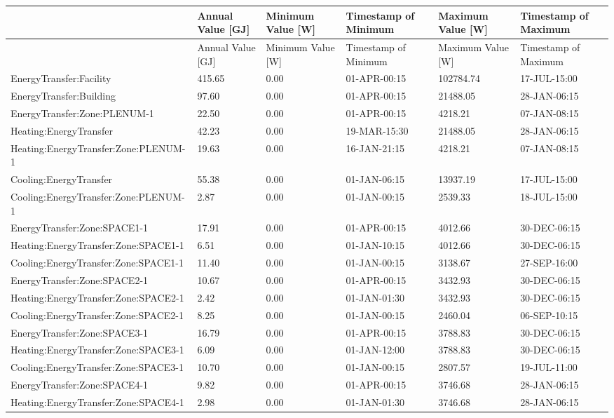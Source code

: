 {\scriptsize
\begin{longtable}[c]{>{\raggedright}p{1.0in}>{\raggedright}p{1.0in}>{\raggedright}p{1.0in}>{\raggedright}p{1.0in}>{\raggedright}p{1.0in}>{\raggedright}p{1.0in}}
\toprule 
 & Annual Value [GJ] & Minimum Value [W] & Timestamp of Minimum & Maximum Value [W] & Timestamp of Maximum \tabularnewline
\midrule
\endfirsthead

\toprule 
 & Annual Value [GJ] & Minimum Value [W] & Timestamp of Minimum & Maximum Value [W] & Timestamp of Maximum \tabularnewline
\midrule
\endhead

EnergyTransfer\-:Facility & 415.65 & 0.00 & 01-APR-00\-:15 & 102784.74 & 17-JUL-15\-:00 \tabularnewline
EnergyTransfer\-:Building & 97.60 & 0.00 & 01-APR-00\-:15 & 21488.05 & 28-JAN-06\-:15 \tabularnewline
EnergyTransfer\-:Zone\-:PLENUM-1 & 22.50 & 0.00 & 01-APR-00\-:15 & 4218.21 & 07-JAN-08\-:15 \tabularnewline
Heating\-:EnergyTransfer & 42.23 & 0.00 & 19-MAR-15\-:30 & 21488.05 & 28-JAN-06\-:15 \tabularnewline
Heating\-:EnergyTransfer\-:Zone\-:PLENUM-1 & 19.63 & 0.00 & 16-JAN-21\-:15 & 4218.21 & 07-JAN-08\-:15 \tabularnewline
Cooling\-:EnergyTransfer & 55.38 & 0.00 & 01-JAN-06\-:15 & 13937.19 & 17-JUL-15\-:00 \tabularnewline
Cooling\-:EnergyTransfer\-:Zone\-:PLENUM-1 & 2.87 & 0.00 & 01-JAN-00\-:15 & 2539.33 & 18-JUL-15\-:00 \tabularnewline
EnergyTransfer\-:Zone\-:SPACE1-1 & 17.91 & 0.00 & 01-APR-00\-:15 & 4012.66 & 30-DEC-06\-:15 \tabularnewline
Heating\-:EnergyTransfer\-:Zone\-:SPACE1-1 & 6.51 & 0.00 & 01-JAN-10\-:15 & 4012.66 & 30-DEC-06\-:15 \tabularnewline
Cooling\-:EnergyTransfer\-:Zone\-:SPACE1-1 & 11.40 & 0.00 & 01-JAN-00\-:15 & 3138.67 & 27-SEP-16\-:00 \tabularnewline
EnergyTransfer\-:Zone\-:SPACE2-1 & 10.67 & 0.00 & 01-APR-00\-:15 & 3432.93 & 30-DEC-06\-:15 \tabularnewline
Heating\-:EnergyTransfer\-:Zone\-:SPACE2-1 & 2.42 & 0.00 & 01-JAN-01\-:30 & 3432.93 & 30-DEC-06\-:15 \tabularnewline
Cooling\-:EnergyTransfer\-:Zone\-:SPACE2-1 & 8.25 & 0.00 & 01-JAN-00\-:15 & 2460.04 & 06-SEP-10\-:15 \tabularnewline
EnergyTransfer\-:Zone\-:SPACE3-1 & 16.79 & 0.00 & 01-APR-00\-:15 & 3788.83 & 30-DEC-06\-:15 \tabularnewline
Heating\-:EnergyTransfer\-:Zone\-:SPACE3-1 & 6.09 & 0.00 & 01-JAN-12\-:00 & 3788.83 & 30-DEC-06\-:15 \tabularnewline
Cooling\-:EnergyTransfer\-:Zone\-:SPACE3-1 & 10.70 & 0.00 & 01-JAN-00\-:15 & 2807.57 & 19-JUL-11\-:00 \tabularnewline
EnergyTransfer\-:Zone\-:SPACE4-1 & 9.82 & 0.00 & 01-APR-00\-:15 & 3746.68 & 28-JAN-06\-:15 \tabularnewline
Heating\-:EnergyTransfer\-:Zone\-:SPACE4-1 & 2.98 & 0.00 & 01-JAN-01\-:30 & 3746.68 & 28-JAN-06\-:15 \tabularnewline

\end{longtable}}
